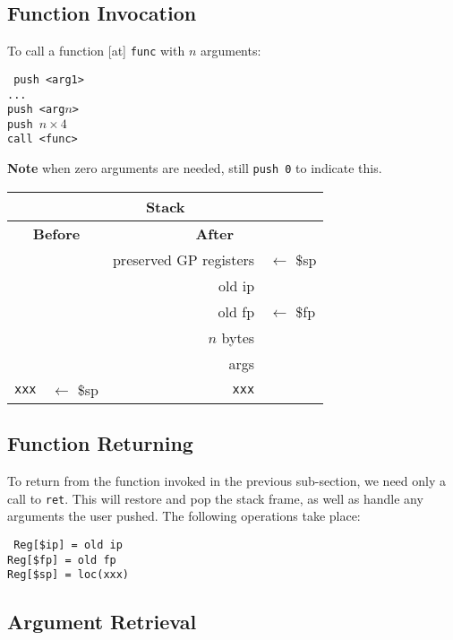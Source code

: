 \documentclass[10pt]{article}
\begin{document}
\subsection{Function Invocation}

To call a function [at] \texttt{func} with \(n\) arguments:

\medskip
\texttt{%
push <arg1>\\%
...\\%
push <arg\(n\)>\\%
push \(n \times 4\)\\%
call <func>
}

\textbf{Note} when zero arguments are needed, still \texttt{push 0} to indicate this.
\medskip

\begin{tabular}{|r l||r l|}
     \hline
     \multicolumn{4}{|c|}{\textbf{Stack}} \\
     \hline
     \multicolumn{2}{|c||}{\textbf{Before}} & \multicolumn{2}{c|}{\textbf{After}} \\
     \hline
     & & preserved GP registers & \(\leftarrow\) \$sp \\
     & & old ip & \\
     & & old fp & \(\leftarrow\) \$fp \\
     & & \(n\) bytes & \\
     & & args & \\
     \texttt{xxx} & \(\leftarrow\) \$sp & \texttt{xxx} & \\
     \hline
\end{tabular}

\subsection{Function Returning}

To return from the function invoked in the previous sub-section, we need only a call to \texttt{ret}.
This will restore and pop the stack frame, as well as handle any arguments the user pushed.
The following operations take place:

\texttt{%
Reg[\$ip] = old ip\\%
Reg[\$fp] = old fp\\%
Reg[\$sp] = loc(xxx)\\%
}

\subsection{Argument Retrieval}
\end{document}

